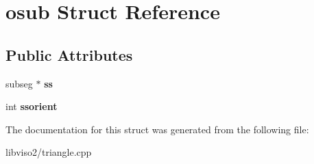\hypertarget{structosub}{\section{osub Struct Reference}
\label{structosub}
}
\subsection*{Public Attributes}
\begin{DoxyCompactItemize}
\item 
\hypertarget{structosub_ac8cba05ff0ad570decd4376b4916d150}{subseg $\ast$ {\bfseries ss}}\label{structosub_ac8cba05ff0ad570decd4376b4916d150}

\item 
\hypertarget{structosub_aa9aac96631bf818c077048456dcf11ee}{int {\bfseries ssorient}}\label{structosub_aa9aac96631bf818c077048456dcf11ee}

\end{DoxyCompactItemize}


The documentation for this struct was generated from the following file\+:\begin{DoxyCompactItemize}
\item 
libviso2/triangle.\+cpp\end{DoxyCompactItemize}
